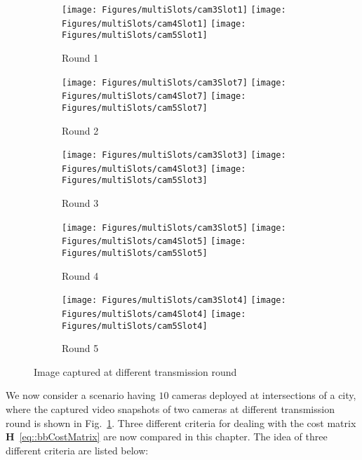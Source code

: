 %
\begin{figure}
\begin{center}
\begin{subfigure}[b]{\columnwidth}
\texttt{[image: Figures/multiSlots/cam3Slot1]}
\texttt{[image: Figures/multiSlots/cam4Slot1]}
\texttt{[image: Figures/multiSlots/cam5Slot1]}
\caption{Round 1}
\end{subfigure}
%
\begin{subfigure}[b]{\columnwidth}
\texttt{[image: Figures/multiSlots/cam3Slot7]}
\texttt{[image: Figures/multiSlots/cam4Slot7]}
\texttt{[image: Figures/multiSlots/cam5Slot7]}
\caption{Round 2}
\end{subfigure}
%
\begin{subfigure}[b]{\columnwidth}
\texttt{[image: Figures/multiSlots/cam3Slot3]}
\texttt{[image: Figures/multiSlots/cam4Slot3]}
\texttt{[image: Figures/multiSlots/cam5Slot3]}
\caption{Round 3}
\end{subfigure}
%
\begin{subfigure}[b]{\columnwidth}
\texttt{[image: Figures/multiSlots/cam3Slot5]}
\texttt{[image: Figures/multiSlots/cam4Slot5]}
\texttt{[image: Figures/multiSlots/cam5Slot5]}
\caption{Round 4}
\end{subfigure}
%
\begin{subfigure}[b]{\columnwidth}
\texttt{[image: Figures/multiSlots/cam3Slot4]}
\texttt{[image: Figures/multiSlots/cam4Slot4]}
\texttt{[image: Figures/multiSlots/cam5Slot4]}
\caption{Round 5}
\end{subfigure}
\caption{\label{fig::imgCapMultiSlots} Image captured at different transmission round}
\end{center}
\end{figure}
%
We now consider a scenario having $10$ cameras deployed at intersections of a city,
where the captured video snapshots of two cameras at different transmission round is shown in Fig.~\ref{fig::imgCapMultiSlots}.
Three different criteria for dealing with the cost matrix $\mathbf{H}$~\eqref{eq::bbCostMatrix} are now compared in this chapter.
The idea of three different criteria are listed below:
